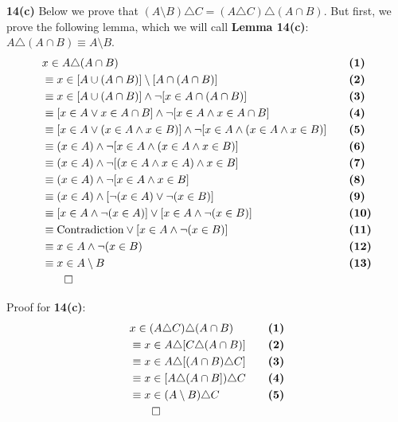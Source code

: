 \textbf{14(c)} Below we prove that $(A \setminus B) \triangle C = (A \triangle C) \triangle (A \cap B)$.
But first, we prove the following lemma, which we will call \textbf{Lemma 14(c)}: $A \triangle (A \cap B) \equiv A \setminus B$.
\begin{alignat*}{2}
&x \in A \triangle (A \cap B)  && \quad \textbf{(1)} \\
&\equiv x \in [A \cup (A \cap B)] \setminus [A \cap (A \cap B)] && \quad \textbf{(2)} \\
&\equiv x \in [A \cup (A \cap B)] \wedge \neg [x \in A \cap (A \cap B)] && \quad \textbf{(3)} \\
&\equiv [x \in A \vee x \in A \cap B] \wedge \neg [x \in A \wedge x \in A \cap B] && \quad \textbf{(4)} \\
&\equiv [x \in A \vee (x \in A \wedge x \in B)] \wedge \neg [x \in A \wedge (x \in A \wedge x \in B)] && \quad \textbf{(5)} \\
&\equiv (x \in A) \wedge \neg [x \in A \wedge (x \in A \wedge x \in B)] && \quad \textbf{(6)} \\
&\equiv (x \in A) \wedge \neg [(x \in A \wedge x \in A) \wedge x \in B] && \quad \textbf{(7)} \\
&\equiv (x \in A) \wedge \neg [x \in A \wedge x \in B] && \quad \textbf{(8)} \\
&\equiv (x \in A) \wedge [\neg (x \in A) \vee \neg (x \in B)] && \quad \textbf{(9)} \\
&\equiv [x \in A \wedge \neg (x \in A)] \vee [x \in A \wedge \neg (x \in B)] && \quad \textbf{(10)} \\
&\equiv \text{Contradiction} \vee [x \in A \wedge \neg (x \in B)] && \quad \textbf{(11)} \\
&\equiv x \in A \wedge \neg (x \in B) && \quad \textbf{(12)} \\
&\equiv x \in A \setminus B && \quad \textbf{(13)} \\
&\qed
\end{alignat*}

Proof for \textbf{14(c)}:
\begin{alignat*}{2}
&x \in (A \triangle C) \triangle (A \cap B) && \quad \textbf{(1)}\\
&\equiv x \in A \triangle [C \triangle (A \cap B)] && \quad \textbf{(2)}\\
&\equiv x \in A \triangle [(A \cap B) \triangle C] && \quad \textbf{(3)}\\
&\equiv x \in [A \triangle (A \cap B]) \triangle C && \quad \textbf{(4)}\\
&\equiv x \in (A \setminus B) \triangle C && \quad \textbf{(5)}\\
&\qed
\end{alignat*}
\pagebreak

